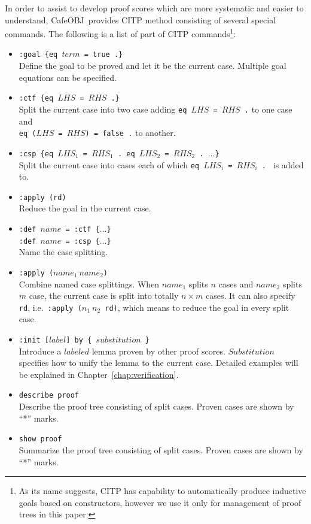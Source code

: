 \documentclass[12pt]{report}
\newcommand{\stt}[1]{{\small{\tt {#1}}}}
\newcommand{\cafeobj}{{\sf CafeOBJ}~}
\begin{document}
In order to assist to develop proof scores which are more systematic
and easier to understand, \cafeobj provides CITP method consisting of
several special commands. The following is a list of part of CITP
commands\footnote{As its name suggests, CITP has capability to
  automatically produce inductive goals based on constructors, however
  we use it only for management of proof trees in this paper.}:
\begin{itemize}
\item \stt{:goal \{eq $term$ = true .\}}\\ Define the goal to be
  proved and let it be the current case. Multiple goal equations
  can be specified.
\item \stt{:ctf \{eq $LHS$ = $RHS$ .\}}\\
  Split the current case into two case adding \stt{eq~$LHS$~=~$RHS$~.} to one case and\\
  \stt{eq~($LHS$~=~$RHS$)~=~false~.} to another.
\item \stt{:csp \{eq $LHS_1$ = $RHS_1$ . eq $LHS_2$ = $RHS_2$ . $\dots$\}}\\
  Split the current case into cases each of which
  \stt{eq~$LHS_i$~=~$RHS_i$~.~} is added to.
\item \stt{:apply (rd)}\\
 Reduce the goal in the current case.
\item \stt{:def $name$ = :ctf \{$\dots$\}}\\
  \stt{:def $name$ = :csp \{$\dots$\}}\\
  Name the case splitting.
\item \stt{:apply ($name_1\ name_2$)}\\ Combine named case
  splittings. When $name_1$ splits $n$ cases and $name_2$ splits $m$
  case, the current case is split into totally $n\times m$ cases.  It
  can also specify {\tt rd}, i.e.\ \stt{:apply~($n_1\ n_2$~rd)}, which
    means to reduce the goal in every split case.
\item \stt{:init [$label$] by \{ $substitution$ \}}\\
  Introduce a $labeled$ lemma proven by other proof scores. $Substitution$ specifies
  how to unify the lemma to the current case. Detailed examples will be explained
  in Chapter~\ref{chap:verification}.
\item \stt{describe proof}\\
 Describe the proof tree consisting of split cases. Proven cases are shown by ``*'' marks.
\item \stt{show proof}\\
Summarize the proof tree consisting of split cases. Proven cases are shown by ``*'' marks.
\end{itemize}
\end{document}
